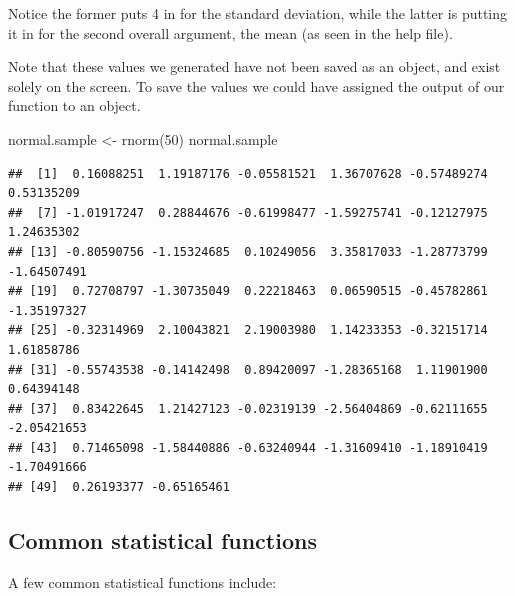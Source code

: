 \documentclass[
]{book}
\newenvironment{Shaded}{\begin{snugshade}}{\end{snugshade}}
\newcommand{\DecValTok}[1]{\textcolor[rgb]{0.00,0.00,0.81}{#1}}
\newcommand{\FunctionTok}[1]{\textcolor[rgb]{0.00,0.00,0.00}{#1}}
\newcommand{\NormalTok}[1]{#1}
\newcommand{\OtherTok}[1]{\textcolor[rgb]{0.56,0.35,0.01}{#1}}
\begin{document}
Notice the former puts 4 in for the standard deviation, while the latter is putting it in for the second overall argument, the mean (as seen in the help file).

Note that these values we generated have not been saved as an object, and exist solely on the screen. To save the values we could have assigned the output of our function to an object.

\begin{Shaded}
\begin{Highlighting}[]
\NormalTok{normal.sample }\OtherTok{\textless{}{-}} \FunctionTok{rnorm}\NormalTok{(}\DecValTok{50}\NormalTok{)}
\NormalTok{normal.sample}
\end{Highlighting}
\end{Shaded}

\begin{verbatim}
##  [1]  0.16088251  1.19187176 -0.05581521  1.36707628 -0.57489274  0.53135209
##  [7] -1.01917247  0.28844676 -0.61998477 -1.59275741 -0.12127975  1.24635302
## [13] -0.80590756 -1.15324685  0.10249056  3.35817033 -1.28773799 -1.64507491
## [19]  0.72708797 -1.30735049  0.22218463  0.06590515 -0.45782861 -1.35197327
## [25] -0.32314969  2.10043821  2.19003980  1.14233353 -0.32151714  1.61858786
## [31] -0.55743538 -0.14142498  0.89420097 -1.28365168  1.11901900  0.64394148
## [37]  0.83422645  1.21427123 -0.02319139 -2.56404869 -0.62111655 -2.05421653
## [43]  0.71465098 -1.58440886 -0.63240944 -1.31609410 -1.18910419 -1.70491666
## [49]  0.26193377 -0.65165461
\end{verbatim}

\hypertarget{common-statistical-functions}{%
\subsection*{Common statistical functions}\label{common-statistical-functions}}

A few common statistical functions include:
\end{document}
